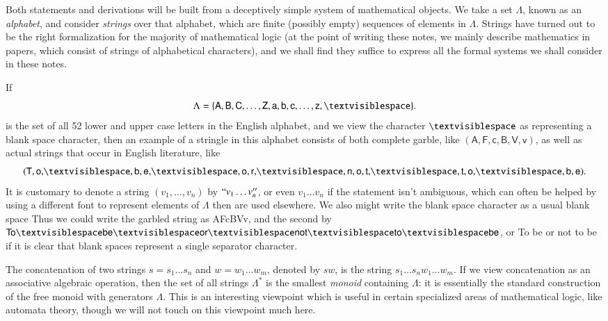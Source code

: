 Both statements and derivations will be built from a deceptively simple system of mathematical objects. We take a set $\Lambda$, known as an \emph{alphabet}, and consider \emph{strings} over that alphabet, which are finite (possibly empty) sequences of elements in $\Lambda$. Strings have turned out to be the right formalization for the majority of mathematical logic (at the point of writing these notes, we mainly describe mathematics in papers, which consist of strings of alphabetical characters), and we shall find they suffice to express all the formal systems we shall consider in these notes.

\begin{example}
    If
    \[ \Lambda = \{ \mathsf{A,B,C}, \dots, \mathsf{Z, a, b, c,} \dots, \textsf{z}, \textvisiblespace \}. \]    
    is the set of all 52 lower and upper case letters in the English alphabet, and we view the character $\textvisiblespace$ as representing a blank space character, then an example of a stringle in this alphabet consists of both complete garble, like $(\mathsf{A,F,c,B,V,v})$, as well as actual strings that occur in English literature, like
    \[ (\mathsf{T,o,}\textvisiblespace\mathsf{,b,e,}\textvisiblespace\mathsf{,o,r,}\textvisiblespace\mathsf{,n,o,t,}\textvisiblespace\mathsf{,t,o,}\textvisiblespace\mathsf{,b,e}). \]
    It is customary to denote a string $(v_1, \dots, v_n)$ by $``v_1 \dots v_n''$, or even $v_1 \dots v_n$ if the statement isn't ambiguous, which can often be helped by using a different font to represent elements of $\Lambda$ then are used elsewhere. We also might write the blank space character as a usual blank space Thus we could write the garbled string as \textsf{AFcBVv}, and the second by $\mathsf{To}\textvisiblespace\mathsf{be}\textvisiblespace\mathsf{or}\textvisiblespace\mathsf{not}\textvisiblespace\mathsf{to}\textvisiblespace\mathsf{be}$, or \textsf{To be or not to be} if it is clear that blank spaces represent a single separator character.
\end{example}

The concatenation of two strings $s = s_1 \dots s_n$ and $w = w_1 \dots w_m$, denoted by $sw$, is the string $s_1 \dots s_n w_1 \dots w_m$. If we view concatenation as an associative algebraic operation, then the set of all strings $\Lambda^*$ is the smallest {\it monoid} containing $\Lambda$: it is essentially the standard construction of the free monoid with generators $\Lambda$. This is an interesting viewpoint which is useful in certain specialized areas of mathematical logic, like automata theory, though we will not touch on this viewpoint much here.

